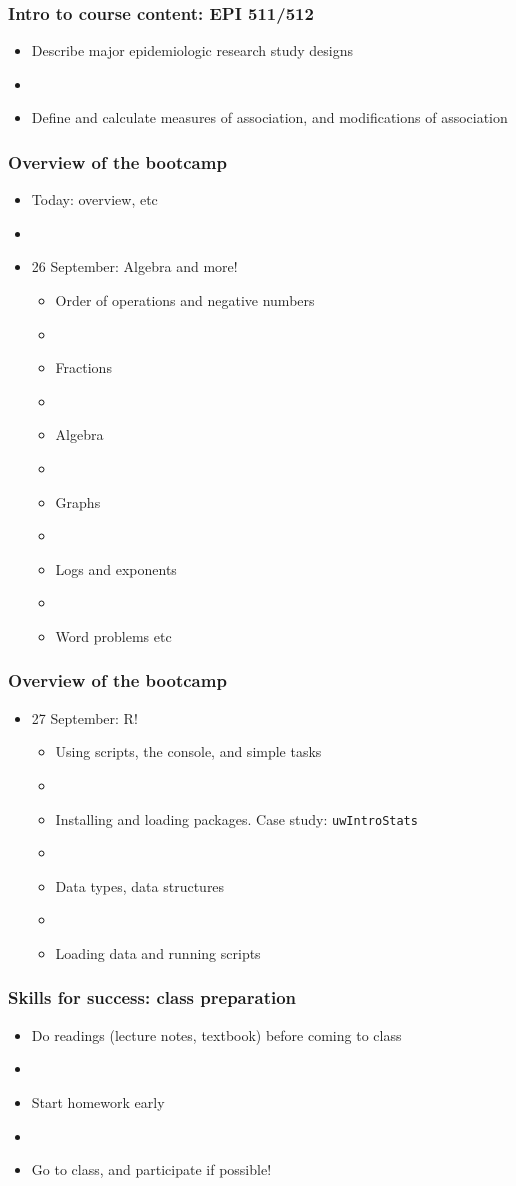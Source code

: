 \documentclass[12pt]{beamer}
\newcommand{\myframe}[1]{\begin{frame} \frametitle{#1}}
\begin{document}
\myframe{Intro to course content: EPI 511/512}
\begin{itemize}
\item Describe major epidemiologic research study designs
\item[]
\item Define and calculate measures of association, and modifications of association
\end{itemize}
\end{frame}
\myframe{Overview of the bootcamp}
\begin{itemize}
\item Today: overview, etc
\item[]
\item 26 September: Algebra and more!
\begin{itemize}
\item Order of operations and negative numbers
\item[]
\item Fractions
\item[]
\item Algebra
\item[]
\item Graphs
\item[]
\item Logs and exponents
\item[]
\item Word problems etc
\end{itemize}
\end{itemize}
\end{frame}

\myframe{Overview of the bootcamp}
\begin{itemize}
\item 27 September: R!
\begin{itemize}
\item Using scripts, the console, and simple tasks
\item[]
\item Installing and loading packages. Case study: \texttt{uwIntroStats}
\item[]
\item Data types, data structures
\item[]
\item Loading data and running scripts
\end{itemize}
\end{itemize}
\end{frame}

\myframe{Skills for success: class preparation}
\begin{itemize}
\item Do readings (lecture notes, textbook) before coming to class
\item[]
\item Start homework early
\item[]
\item Go to class, and participate if possible!
\end{itemize}
\end{frame}
\end{document}
